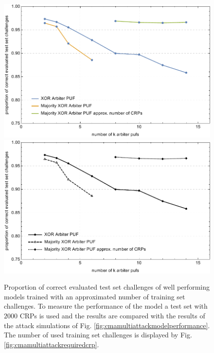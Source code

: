 \begin{figure}[ht]
\ifx{}\undefined
{}
\else
	\if{}
	\centering
	\includegraphics[width=1.00\textwidth]{images/xor-cma-attack-approx.pdf}
	\else
	\includegraphics[width=1.00\textwidth]{images/xor-cma-attack-approx_mono.pdf}
	\fi
\fi
\caption[Proportion of correct evaluated test set challenges for Majority \acs{XOR} \puf models with approximated required number of training set challenges]{Proportion of correct evaluated test set challenges of well performing models trained with an approximated number of training set challenges. To measure the performance of the model a test set with $2000$ \acp{CRP} is used and the results are compared with the results of the attack simulations of Fig. \ref{fig:cmamultiattackmodelperformance}. The number of used training set challenges is displayed by Fig. \ref{fig:cmamultiattackrequiredcrp}.}
\label{fig:cmamultiattackmvmodelperformance}
\end{figure}

